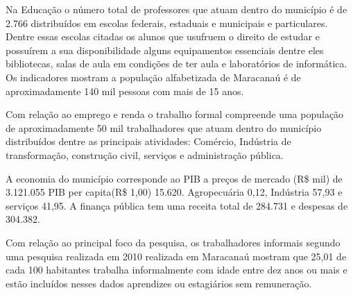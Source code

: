 Na Educação o número total de professores que atuam dentro do município é de 2.766 distribuídos em escolas 
federais, estaduais e municipais e particulares. Dentre essas escolas citadas os alunos que usufruem o
direito de estudar e possuírem a sua disponibilidade alguns equipamentos essenciais dentre eles bibliotecas,
salas de aula em condições de ter aula e laboratórios de informática. Os indicadores mostram a população 
alfabetizada de Maracanaú é de aproximadamente 140 mil pessoas com mais de 15 anos.

Com relação ao emprego e renda o trabalho formal compreende uma população de aproximadamente 50 mil
trabalhadores que atuam dentro do município distribuídos dentre as principais atividades: Comércio, 
Indústria de transformação, construção civil, serviços e administração pública.

A economia do município corresponde ao PIB a preços de mercado (R\$ mil) de 3.121.055 PIB per capita(R\$ 1,00) 
15.620. Agropecuária 0,12, Indústria 57,93 e serviços 41,95. A finança pública tem uma receita total de 284.731 
e despesas de 304.382.

Com relação ao principal foco da pesquisa, os trabalhadores informais segundo uma pesquisa realizada em 2010 
realizada em Maracanaú mostram que 25,01 de cada 100 habitantes trabalha informalmente com idade entre dez anos 
ou mais e estão incluídos nesses dados aprendizes ou estagiários sem remuneração.
